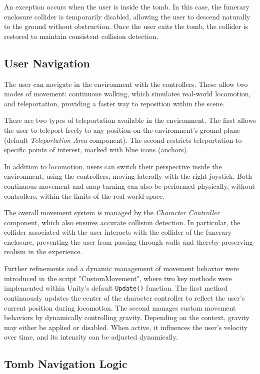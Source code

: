 An exception occurs when the user is inside the tomb. In this case, the funerary enclosure collider is temporarily disabled, allowing the user to descend naturally to the ground without obstruction. Once the user exits the tomb, the collider is restored to maintain consistent collision detection.

\subsection*{User Navigation}
\label{sec:user_navigation}

The user can navigate in the environment with the controllers. 
These allow two modes of movement: continuous walking, which simulates real-world locomotion, and teleportation, providing a faster way to reposition within the scene.

There are two types of teleportation available in the environment. The first allows the user to teleport freely to any position on the environment’s ground plane (default \emph{Teleportation Area} component). The second restricts teleportation to specific points of interest, marked with blue icons (anchors).

In addition to locomotion, users can switch their perspective inside the environment, using the controllers, moving laterally with the right joystick.
Both continuous movement and snap turning can also be performed physically, without controllers, within the limits of the real-world space.

The overall movement system is managed by the \emph{Character Controller} component, which also ensures accurate collision detection. In particular, the collider associated with the user interacts with the collider of the funerary enclosure, preventing the user from passing through walls and thereby preserving realism in the experience.

Further refinements and a dynamic management of movement behavior were introduced in the script "CustomMovement", where two key methods were implemented within Unity’s default \texttt{Update()} function.
The first method continuously updates the center of the character controller to reflect the user’s current position during locomotion. 
The second manages custom movement behaviors by dynamically controlling gravity. Depending on the context, gravity may either be applied or disabled. When active, it influences the user’s velocity over time, and its intensity can be adjusted dynamically.

\subsection*{Tomb Navigation Logic}
\label{sec:tomb_logic}


